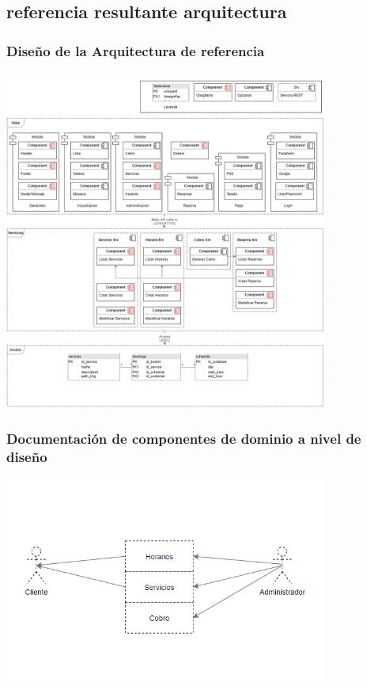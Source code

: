 \documentclass[10pt,a4paper,openany]{book}
\begin{document}
\subsection{referencia resultante arquitectura}
\subsubsection{Diseño de la Arquitectura de referencia}
\begin{center}
\includegraphics[width=0.8\textwidth]{arq3}
\end{center}

\subsubsection{Documentación de componentes de dominio a nivel de diseño}
\begin{center}
\includegraphics[width=0.8\textwidth]{dominio}
\end{center}
\end{document}
